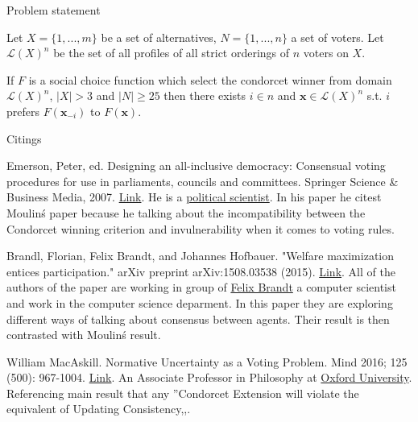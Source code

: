 \documentclass[12pt]{article}
\newenvironment{answer}[2][Answer]{\begin{trivlist}
\item[\hskip \labelsep {\bfseries #1}\hskip \labelsep {\bfseries #2:}]}{\end{trivlist}}
\begin{document}
\begin{answer}{c)}{Problem statement}

Let $X=\{1, ..., m \}$ be a set of alternatives, $N=\{1, ..., n \}$ a set of voters. Let $\mathcal{L}(X)^n$ be the set of all profiles of all strict orderings of $n$ voters on $X$.

If $F$ is a social choice function which select the condorcet winner from domain $\mathcal{L}(X)^n$, $|X|>3$ and $|N| \geq 25$ then there exists $i \in n$ and $\boldsymbol{x} \in \mathcal{L}(X)^n$ s.t. $i$ prefers $F(\boldsymbol{x}_{-i})$ to $F(\boldsymbol{x})$.
\end{answer}

\begin{answer}{d)}{Citings}

Emerson, Peter, ed. Designing an all-inclusive democracy: Consensual voting procedures for use in parliaments, councils and committees. Springer Science \& Business Media, 2007. \href{https://books.google.nl/books?hl=en&lr=&id=9mM67vrwz64C&oi=fnd&pg=PR7&ots=4racgvSsRl&sig=UY4F1d51wmhIVBF9R7YL6Upf3j8#v=onepage&q&f=false}{Link}.
He is a \href{https://www.researchgate.net/profile/Peter_Emerson/info}{political scientist}.
In his paper he citest Moulin\'s paper because he talking about the incompatibility between the Condorcet winning criterion and invulnerability when it comes to voting rules.

Brandl, Florian, Felix Brandt, and Johannes Hofbauer. "Welfare maximization entices participation." arXiv preprint arXiv:1508.03538 (2015).
\href{https://arxiv.org/pdf/1508.03538.pdf}{Link}.
All of the authors of the paper are working in group of \href{http://dss.in.tum.de/staff/brandt.html}{Felix Brandt} a computer scientist and work in the computer science deparment.
In this paper they are exploring different ways of talking about consensus between agents. Their result is then contrasted with Moulin\'s result.

William MacAskill. Normative Uncertainty as a Voting Problem. Mind 2016; 125 (500): 967-1004.
\href{https://academic.oup.com/mind/article-lookup/doi/10.1093/mind/fzv169}{Link}.
An Associate Professor in Philosophy at \href{https://www.fhi.ox.ac.uk/team/william-macaskill/}{Oxford University}.
Referencing main result that any ''Condorcet Extension will violate the equivalent of Updating Consistency,,.
\end{answer}
\end{document}
